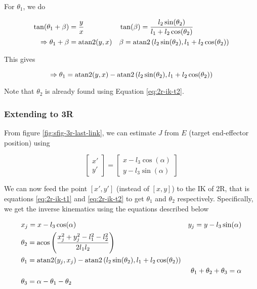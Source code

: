 For $\theta_1$, we do

\begin{align}
    \tan(\theta_1 + \beta) &= \frac{y}{x} &&
    \tan(\beta) = \frac{l_2 \sin(\theta_2)}{l_1 + l_2 \cos(\theta_2)} 
    \nonumber \\
    \Rightarrow \theta_1 + \beta &= \textup{atan2}(y, x) &&
    \beta = \textup{atan2} \left ( l_2 \sin(\theta_2) , l_1 + l_2 \cos(\theta_2) \right )
    \nonumber
\end{align}

This gives

\begin{equation}
    \Rightarrow \theta_1 = \textup{atan2}(y, x) - \textup{atan2} \left ( l_2 \sin(\theta_2) , l_1 + l_2 \cos(\theta_2) \right )
    \label{eq:2r-ik-t1}
\end{equation}

Note that $\theta_2$ is already found using Equation \ref{eq:2r-ik-t2}.

\subsubsection*{Extending to 3R}

From figure \ref{fig:sfig-3r-last-link}, we can estimate $J$ from $E$ (target end-effector position) using

\begin{equation}
    \begin{bmatrix}
        x' \\ y'
        \end{bmatrix} = \begin{bmatrix}
        x - l_3 \cos (\alpha) \\
        y - l_3 \sin (\alpha)
        \end{bmatrix}
    \label{eq:j3-fm-ef}
\end{equation}

We can now feed the point $[x', y']$ (instead of $[x, y]$) to the IK of 2R, that is equations \ref{eq:2r-ik-t1} and \ref{eq:2r-ik-t2} to get $\theta_1$ and $\theta_2$ respectively. Specifically, we get the inverse kinematics using the equations described below

\begin{align}
    & x_j = x - l_3 \cos(\alpha)
    & y_j = y - l_3 \sin(\alpha)
    \nonumber \\
    & \theta_2 = \textup{acos} \left ( \frac{x_j^2 + y_j^2 - l_1^2 - l_2^2}{2l_1l_2} \right )
    \label{eq:3r-ik-t2}
    \\
    & \theta_1 = \textup{atan2}(y_j, x_j) - \textup{atan2} \left ( l_2 \sin(\theta_2) , l_1 + l_2 \cos(\theta_2) \right )
    \label{eq:3r-ik-t1}
    \\
    && \theta_1 + \theta_2 + \theta_3 = \alpha
    \nonumber \\
    & \theta_3 = \alpha - \theta_1 - \theta_2
    \label{eq:3r-ik-t3}
\end{align}

